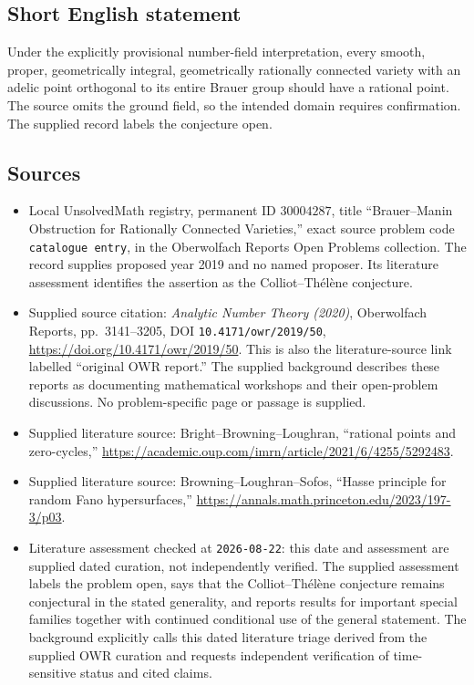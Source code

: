 \documentclass[11pt]{article}
\begin{document}
\subsection{Short English statement}
Under the explicitly provisional number-field interpretation, every smooth, proper, geometrically integral, geometrically rationally connected variety with an adelic point orthogonal to its entire Brauer group should have a rational point. The source omits the ground field, so the intended domain requires confirmation. The supplied record labels the conjecture open.
\subsection{Sources}
\begin{itemize}
\item Local UnsolvedMath registry, permanent ID \(30004287\), title ``Brauer--Manin Obstruction for Rationally Connected Varieties,'' exact source problem code \texttt{catalogue entry}, in the Oberwolfach Reports Open Problems collection. The record supplies proposed year 2019 and no named proposer. Its literature assessment identifies the assertion as the Colliot--Th\'el\`ene conjecture.
\item Supplied source citation: \emph{Analytic Number Theory (2020)}, Oberwolfach Reports, pp.\ 3141--3205, DOI \texttt{10.4171/owr/2019/50}, \url{https://doi.org/10.4171/owr/2019/50}. This is also the literature-source link labelled ``original OWR report.'' The supplied background describes these reports as documenting mathematical workshops and their open-problem discussions. No problem-specific page or passage is supplied.
\item Supplied literature source: Bright--Browning--Loughran, ``rational points and zero-cycles,'' \url{https://academic.oup.com/imrn/article/2021/6/4255/5292483}.
\item Supplied literature source: Browning--Loughran--Sofos, ``Hasse principle for random Fano hypersurfaces,'' \url{https://annals.math.princeton.edu/2023/197-3/p03}.
\item Literature assessment checked at \texttt{2026-08-22}: this date and assessment are supplied dated curation, not independently verified. The supplied assessment labels the problem open, says that the Colliot--Th\'el\`ene conjecture remains conjectural in the stated generality, and reports results for important special families together with continued conditional use of the general statement. The background explicitly calls this dated literature triage derived from the supplied OWR curation and requests independent verification of time-sensitive status and cited claims.
\end{itemize}
\end{document}
